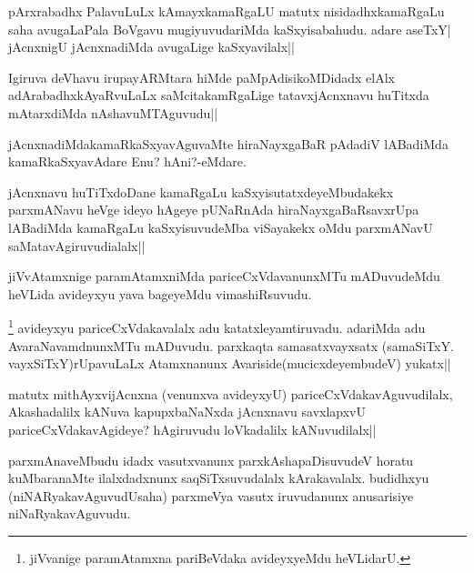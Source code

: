 \begin{artha}
pArxrabadhx PalavuLuLx kAmayxkamaRgaLU matutx nisidadhxkamaRgaLu saha avugaLaPala BoVgavu mugiyuvudariMda kaSxyisabahudu. adare aseTxY| jAcnxnigU jAcnxnadiMda avugaLige kaSxyavilalx||
\end{artha}

\begin{artha}
Igiruva deVhavu irupayARMtara hiMde paMpAdisikoMDidadx elAlx adArabadhxkAyaRvuLaLx saMcitakamRgaLige tatavxjAcnxnavu huTitxda mAtarxdiMda nAshavuMTAguvudu||
\end{artha}

\begin{artha}
jAcnxnadiMdakamaRkaSxyavAguvaMte hiraNayxgaBaR pAdadiV lABadiMda kamaRkaSxyavAdare Enu? hAni?-eMdare.
\end{artha}


\begin{artha}
jAcnxnavu huTiTxdoDane kamaRgaLu kaSxyisutatxdeyeMbudakekx parxmANavu heVge ideyo hAgeye pUNaRnAda hiraNayxgaBaRsavxrUpa lABadiMda kamaRgaLu kaSxyisuvudeMba viSayakekx oMdu parxmANavU saMatavAgiruvudialalx||
\end{artha}

\begin{artha}
jiVvAtamxnige paramAtamxniMda pariceCxVdavanunxMTu mADuvudeMdu heVLida avideyxyu yava bageyeMdu vimashiRsuvudu.
\end{artha}



\begin{artha}
\footnote{jiVvanige paramAtamxna pariBeVdaka avideyxyeMdu heVLidarU.} avideyxyu pariceCxVdakavalalx adu katatxleyamtiruvadu. adariMda adu AvaraNavamdnunxMTu mADuvudu. parxkaqta samasatxvayxsatx (samaSiTxY. vayxSiTxY)rUpavuLaLx Atamxnanunx Avariside(mucicxdeyembudeV) yukatx||
\end{artha}

\begin{artha}
matutx mithAyxvijAcnxna (venunxva avideyxyU) pariceCxVdakavAguvudilalx, Akashadalilx 
kANuva kapupxbaNaNxda jAcnxnavu savxlapxvU pariceCxVdakavAgideye? hAgiruvudu loVkadalilx 
kANuvudilalx||
\end{artha}

\begin{artha}
parxmAnaveMbudu idadx vasutxvanunx parxkAshapaDisuvudeV horatu kuMbaranaMte ilalxdadxnunx 
saqSiTxsuvudalalx kArakavalalx. budidhxyu (niNARyakavAguvudUsaha) parxmeVya vasutx 
iruvudanunx anusarisiye niNaRyakavAguvudu.
\end{artha}

